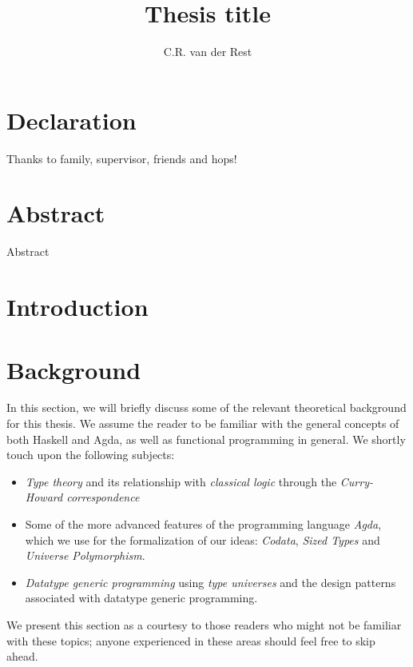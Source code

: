 \documentclass[a4paper,msc,twosized=semi]{uustthesis}
\title{Thesis title}
\author{C.R. van der Rest}
\begin{document}
\maketitle

\frontmatter
\tableofcontents

\chapter{Declaration}
Thanks to family, supervisor, friends and hops!

\chapter{Abstract}
Abstract

\mainmatter

\chapter{Introduction}

\chapter{Background}
In this section, we will briefly discuss some of the relevant theoretical background 
for this thesis. We assume the reader to be familiar with the general concepts of both 
Haskell and Agda, as well as functional programming in general. We shortly touch upon 
the following subjects:

\begin{itemize}
  \item
  \emph{Type theory} and its relationship with \emph{classical logic} through the 
  \emph{Curry-Howard correspondence}

  \item 
  Some of the more advanced features of the programming language \emph{Agda}, which we 
  use for the formalization of our ideas: \emph{Codata}, \emph{Sized Types} and \emph
  {Universe Polymorphism}. 

  \item 
  \emph{Datatype generic programming} using \emph{type universes} and the design 
  patterns associated with datatype generic programming.  
\end{itemize}

  We present this section as a courtesy to those readers who might not be familiar 
  with these topics; anyone experienced in these areas should feel free to skip ahead. 
\end{document}
